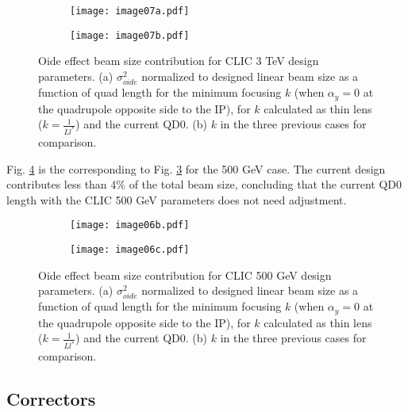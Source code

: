 \begin{figure}[!htb]
\centering
\hspace*{-0.6cm}
\begin{subfigure}{0.45\textwidth}
\centering
\texttt{[image: image07a.pdf]}\caption{}\label{fig-3TeV:a}
\end{subfigure}
\begin{subfigure}{0.45\textwidth}
\centering
\texttt{[image: image07b.pdf]}\caption{}\label{fig-3TeV:b}
\end{subfigure}
\caption{Oide effect beam size contribution for CLIC 3 TeV design parameters. (a) $\sigma^2_{oide}$ normalized to designed linear beam size as a function of quad length for the minimum focusing $k$ (when $\alpha_y=0$ at the quadrupole opposite side to the IP), for $k$ calculated as thin lens ($k=\frac{1}{Ll^*}$) and the current QD0. (b) $k$ in the three previous cases for comparison.}\label{fig-3TeV}	
 \end{figure}\par
Fig. \ref{fig-500GeV} is the corresponding to Fig. \ref{fig-3TeV} for the 500 GeV case. The current design contributes less than 4\% of the total beam size, concluding that the current QD0 length with the CLIC 500 GeV parameters does not need adjustment.\par
\begin{figure}[!htb]
\centering
\hspace*{-0.6cm}
\begin{subfigure}{0.45\textwidth}
\centering
\texttt{[image: image06b.pdf]}\caption{}
\end{subfigure}
\begin{subfigure}{0.45\textwidth}
\centering
\texttt{[image: image06c.pdf]}\caption{}
\end{subfigure}
\caption{Oide effect beam size contribution for CLIC 500 GeV design parameters. (a) $\sigma^2_{oide}$ normalized to designed linear beam size as a function of quad length for the minimum focusing $k$ (when $\alpha_y=0$ at the quadrupole opposite side to the IP), for $k$ calculated as thin lens ($k=\frac{1}{Ll^*}$) and the current QD0. (b) $k$ in the three previous cases for comparison.}\label{fig-500GeV}
 \end{figure}\par	

\subsection{Correctors}
